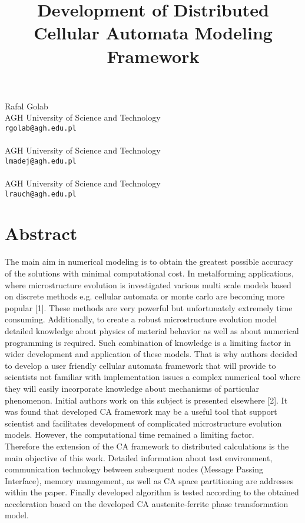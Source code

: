 \title{Development of Distributed Cellular Automata Modeling Framework}
 \author{} \institute{}
\maketitle
\begin{center}
{\large Rafal Golab}\\
AGH University of Science and Technology\\
{\tt rgolab@agh.edu.pl}
\\ \vspace{4mm}{\large Lukasz Madej}\\
AGH University of Science and Technology\\
{\tt lmadej@agh.edu.pl}
\\ \vspace{4mm}{\large Lukasz Rauch}\\
AGH University of Science and Technology\\
{\tt lrauch@agh.edu.pl}

\end{center}

\section*{Abstract}

The main aim in numerical modeling is to obtain the greatest possible accuracy of the solutions with minimal computational cost. In metalforming applications, where microstructure evolution is investigated various multi scale models based on discrete methods e.g. cellular automata or monte carlo are becoming more popular [1]. These methods are very powerful but unfortunately extremely time consuming. Additionally, to create a robust microstructure evolution model detailed knowledge about physics of material behavior as well as about numerical programming is required. Such combination of knowledge is a limiting factor in wider development and application of these models. That is why authors decided to develop a user friendly cellular automata framework that will provide to scientists not familiar with implementation issues a complex numerical tool where they will easily incorporate knowledge about mechanisms of particular phenomenon. Initial authors work on this subject is presented elsewhere [2]. It was found that developed CA framework may be a useful tool that support scientist and facilitates development of complicated microstructure evolution models. However, the computational time remained a limiting factor. 
\\Therefore the extension of the CA framework to distributed calculations is the main objective of this work. Detailed information about test environment, communication technology between subsequent nodes (Message Passing Interface), memory management, as well as CA space partitioning are addresses within the paper. Finally developed algorithm is tested according to the obtained acceleration based on the developed CA austenite-ferrite phase transformation model. 


